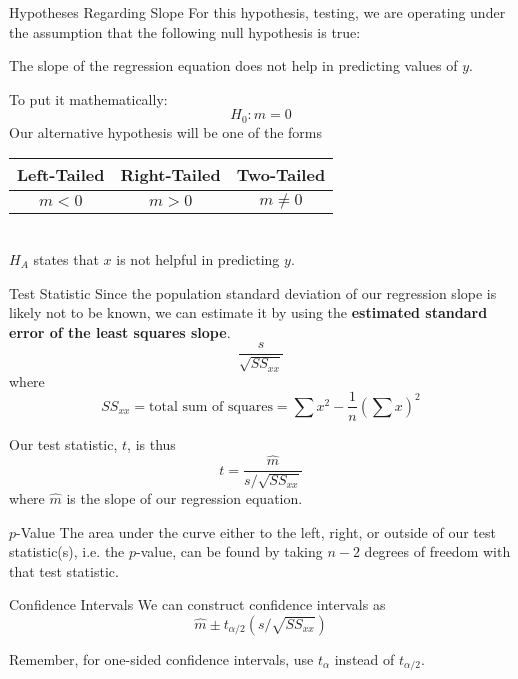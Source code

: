 \documentclass[t]{beamer}
\begin{document}
\begin{frame}{Hypotheses Regarding Slope}
For this hypothesis, testing, we are operating under the assumption that the following null hypothesis is true:
\begin{center}
The slope of the regression equation does not help in predicting values of $y$.
\end{center}	\pause
To put it mathematically:
\[
H_0: m = 0
\]
\pause
Our alternative hypothesis will be one of the forms
\begin{center}
\begin{tabular}{|c|c|c|}
\hline
\textbf{Left-Tailed} & \textbf{Right-Tailed} & \textbf{Two-Tailed}  \\ \hline 
$m < 0$ & $m > 0$ & $m \neq 0$ \\ \hline
\end{tabular}	\pause	\newline\\
$H_A$ states that $x$ is not helpful in predicting $y$.
\end{center}
\end{frame}

\begin{frame}{Test Statistic}
Since the population standard deviation of our regression slope is likely not to be known, we can estimate it by using the {\color{blue}\textbf{estimated standard error of the least squares slope}}.	\pause
\[
\frac{s}{\sqrt{SS_{xx}}}
\]
where 
\[
SS_{xx} = \text{total sum of squares} = \sum x^2 - \frac{1}{n}\left(\sum x\right)^2
\]
\pause

Our test statistic, $t$, is thus
\[
t = \frac{\hat{m}}{s/\sqrt{SS_{xx}}}
\]
where $\hat{m}$ is the slope of our regression equation.
\end{frame}

\begin{frame}{$p$-Value}
The area under the curve either to the left, right, or outside of our test statistic(s), i.e. the $p$-value, can be found by taking $n-2$ degrees of freedom with that test statistic.
\end{frame}

\begin{frame}{Confidence Intervals}
We can construct confidence intervals as
\[
\hat{m} \pm t_{\alpha/2}\left(s/\sqrt{SS_{xx}}\right)
\]
\pause

Remember, for one-sided confidence intervals, use $t_{\alpha}$ instead of $t_{\alpha/2}$.
\end{frame}
\end{document}
